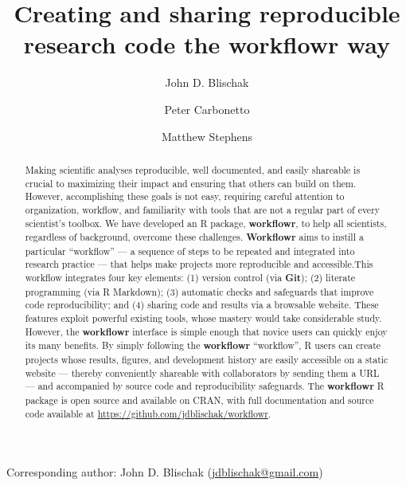 \documentclass[9pt,a4paper]{extarticle}
\begin{document}
\pagestyle{front}

\title{Creating and sharing reproducible research code the \textbf{workflowr}
way}

\author[1]{John D. Blischak}

\author[1,2]{Peter Carbonetto}

\author[1,3]{Matthew Stephens}




\maketitle

\thispagestyle{front}

Corresponding author: John D. Blischak
(\href{_mailto:jdblischak@gmail.com_}{jdblischak@gmail.com})\\

\begin{abstract}


Making scientific analyses reproducible, well documented, and easily
shareable is crucial to maximizing their impact and ensuring that others
can build on them. However, accomplishing these goals is not easy,
requiring careful attention to organization, workflow, and familiarity
with tools that are not a regular part of every scientist's toolbox. We
have developed an R package, \textbf{workflowr}, to help all scientists,
regardless of background, overcome these challenges. \textbf{Workflowr} aims to
instill a particular ``workflow'' --- a sequence of steps to be repeated
and integrated into research practice --- that helps make projects more
reproducible and accessible.This workflow integrates four key elements:
(1) version control (via \textbf{Git}); (2) literate programming (via R
Markdown); (3) automatic checks and safeguards that improve code
reproducibility; and (4) sharing code and results via a browsable
website. These features exploit powerful existing tools, whose mastery
would take considerable study. However, the \textbf{workflowr} interface is
simple enough that novice users can quickly enjoy its many benefits. By
simply following the \textbf{workflowr} ``workflow'', R users can create projects
whose results, figures, and development history are easily accessible on
a static website --- thereby conveniently shareable with collaborators
by sending them a URL --- and accompanied by source code and
reproducibility safeguards. The \textbf{workflowr} R package is open source and
available on CRAN, with full documentation and source code available at
\url{https://github.com/jdblischak/workflowr}.

\end{abstract}
\end{document}
